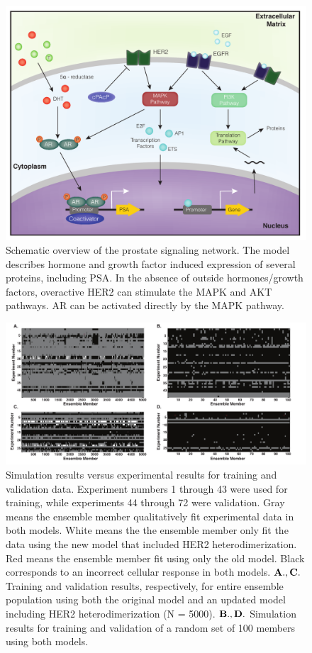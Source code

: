 \documentclass[12pt]{article}
\begin{document}
\begin{figure}\centering
\includegraphics[width=1.0\textwidth]{./figs/Fig_1_LNCAPModel.pdf}
\caption{Schematic overview of the prostate signaling network. The model describes hormone and growth factor induced expression of several proteins, including PSA. In the absence of outside hormones/growth factors, overactive HER2 can stimulate the MAPK and AKT pathways. AR can be activated directly by the MAPK pathway.
}
\label{fg:NetworkSchematic}
\end{figure}

\clearpage

\begin{figure}\centering
\includegraphics[width=1.0\textwidth]{./figs/Fig_3_ColorPlot.pdf}
\caption{Simulation results versus experimental results for training and validation data. Experiment numbers 1 through 43 were used for training, while experiments 44 through 72 were validation. Gray means the ensemble member qualitatively fit experimental data in both models. White means the the ensemble member only fit the data using the new model that included HER2 heterodimerization. Red means the ensemble member fit using only the old model. Black corresponds to an incorrect cellular response in both models.   $\bf{A.,C.}$ Training and validation results, respectively, for entire ensemble population using both the original model and an updated model including HER2 heterodimerization (N = 5000). $\bf{B.,D.}$ Simulation results for training and validation of a random set of 100 members using both models. 
 }
\label{fg:ColorPlot}
\end{figure}
\end{document}
